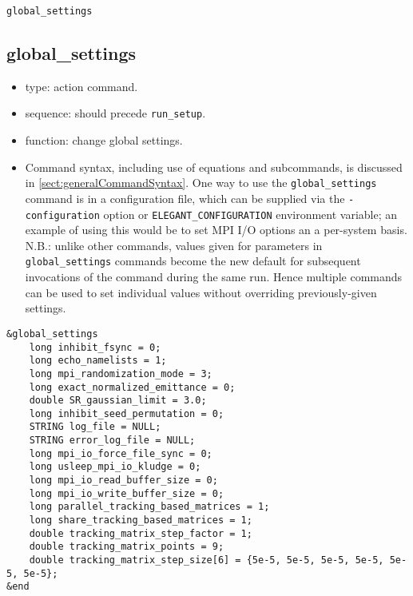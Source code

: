 \documentclass[11pt]{article}
\begin{document}
\newpage
\begin{center}{\Large\verb|global_settings|}\end{center}
\subsection{global\_settings \label{subsec:globalsettings}}

\begin{itemize}
\item type: action command.  
\item sequence: should precede \verb|run_setup|.
\item function: change global settings.
\item Command syntax, including use of equations and subcommands, is discussed in \ref{sect:generalCommandSyntax}.
 One way to use the \verb|global_settings| command is in a configuration file, which can be supplied via the 
 \verb|-configuration| option or \verb|ELEGANT_CONFIGURATION| environment variable; an example of using this
 would be to set MPI I/O options an a per-system basis.
 N.B.: unlike other commands, values given for parameters in \verb|global_settings| commands become the
 new default for subsequent invocations of the command during the same run. Hence multiple commands can be used
 to set individual values without overriding previously-given settings.
\end{itemize}

\begin{verbatim}
&global_settings
    long inhibit_fsync = 0;
    long echo_namelists = 1;
    long mpi_randomization_mode = 3;
    long exact_normalized_emittance = 0;
    double SR_gaussian_limit = 3.0;
    long inhibit_seed_permutation = 0;
    STRING log_file = NULL;
    STRING error_log_file = NULL;
    long mpi_io_force_file_sync = 0;
    long usleep_mpi_io_kludge = 0;
    long mpi_io_read_buffer_size = 0;
    long mpi_io_write_buffer_size = 0;
    long parallel_tracking_based_matrices = 1;
    long share_tracking_based_matrices = 1;
    double tracking_matrix_step_factor = 1;
    double tracking_matrix_points = 9;
    double tracking_matrix_step_size[6] = {5e-5, 5e-5, 5e-5, 5e-5, 5e-5, 5e-5};
&end
\end{verbatim}
\end{document}
